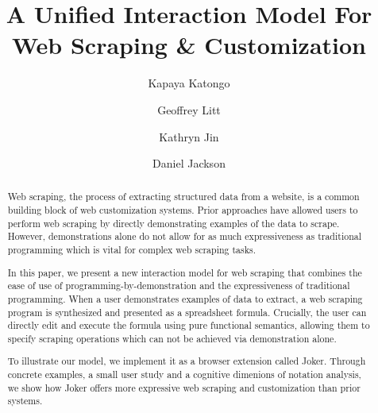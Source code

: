 \documentclass[sigconf,10pt]{acmart}
\begin{document}
\title{A Unified Interaction Model For Web Scraping \& Customization}


\author{Kapaya Katongo}

\author{Geoffrey Litt}

\author{Kathryn Jin}

\author{Daniel Jackson}


\begin{abstract}
  Web scraping, the process of extracting structured data from a
  website, is a common building block of web customization systems.
  Prior approaches have allowed users to perform web scraping by
  directly demonstrating examples of the data to scrape. However,
  demonstrations alone do not allow for as much expressiveness as
  traditional programming which is vital for complex web scraping tasks.

  In this paper, we present a new interaction model for web scraping
  that combines the ease of use of programming-by-demonstration and the
  expressiveness of traditional programming. When a user demonstrates
  examples of data to extract, a web scraping program is synthesized and
  presented as a spreadsheet formula. Crucially, the user can directly
  edit and execute the formula using pure functional semantics, allowing
  them to specify scraping operations which can not be achieved via
  demonstration alone.

  To illustrate our model, we implement it as a browser extension called
  Joker. Through concrete examples, a small user study and a cognitive
  dimenions of notation analysis, we show how Joker offers more
  expressive web scraping and customization than prior systems.
\end{abstract}
\end{document}

